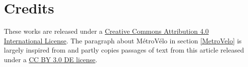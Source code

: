 \documentclass{article}
\begin{document}
\section*{Credits}
\label{sec:Credits}
These works are released under a \href{https://creativecommons.org/licenses/by/4.0/}{Creative Commons Attribution 4.0 International License}. The paragraph about MétroVélo in section \ref{MetroVelo} is largely inspired from \cite{bonvoisinOpennessSupportiveParadigm2013} and partly copies passages of text from this article released under a \href{https://creativecommons.org/licenses/by/3.0/de/deed.en}{CC BY 3.0 DE license}.



\end{document}
